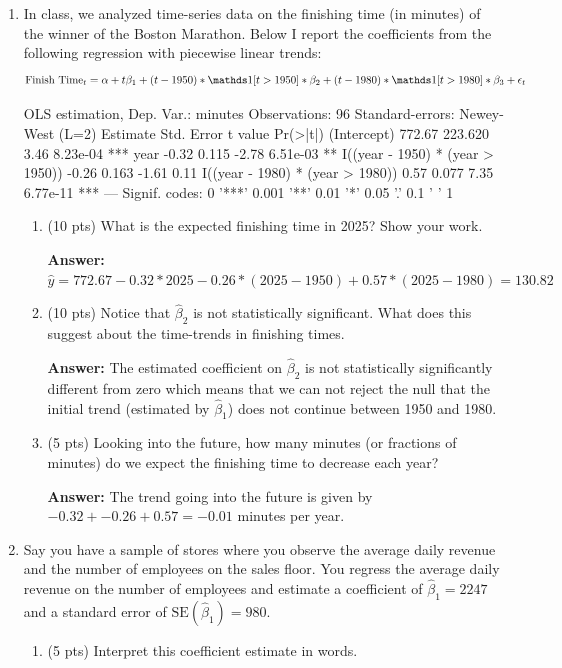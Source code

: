 \documentclass[12pt]{article}
\newcommand{\answer}[1]{{\color{blue_winged_teal}\textbf{Answer:} #1}}
\newcommand{\pts}[1]{{\color{zinc500}(#1 pts)}}
\begin{document}
\begin{enumerate}
  \newpage
  \item In class, we analyzed time-series data on the finishing time (in minutes) of the winner of the Boston Marathon. Below I report the coefficients from the following regression with piecewise linear trends:
  \vspace*{-\bigskipamount}
  $$
    \text{Finish Time}_t = \alpha + t \beta_1 + (t - 1950) * \one{t > 1950} * \beta_2 + (t - 1980) * \one{t > 1980} * \beta_3 + \epsilon_t
  $$

  \begin{codeblock}[{}]
OLS estimation, Dep. Var.: minutes
Observations: 96
Standard-errors: Newey-West (L=2)
                                  Estimate  Std. Error  t value   Pr(>|t|)
(Intercept)                         772.67     223.620     3.46   8.23e-04 ***
year                                 -0.32       0.115    -2.78   6.51e-03 **
I((year - 1950) * (year > 1950))     -0.26       0.163    -1.61   0.11
I((year - 1980) * (year > 1980))      0.57       0.077     7.35   6.77e-11 ***
---
Signif. codes:  0 '***' 0.001 '**' 0.01 '*' 0.05 '.' 0.1 ' ' 1
  \end{codeblock}

  \begin{enumerate}
    \item \pts{10} What is the expected finishing time in 2025? Show your work.

    \answer{
      $\hat{y} = 772.67 - 0.32 * 2025 - 0.26 * (2025 - 1950) + 0.57 * (2025 - 1980) = 130.82$
    }

    \item \pts{10} Notice that $\hat{\beta}_2$ is not statistically significant. What does this suggest about the time-trends in finishing times.

    \answer{
      The estimated coefficient on $\hat{\beta}_2$ is not statistically significantly different from zero which means that we can not reject the null that the initial trend (estimated by $\hat{\beta}_1$) does not continue between 1950 and 1980.
    }

    \item \pts{5} Looking into the future, how many minutes (or fractions of minutes) do we expect the finishing time to decrease each year?

    \answer{The trend going into the future is given by $-0.32 + -0.26 + 0.57 = -0.01$ minutes per year.}
  \end{enumerate}




  \vspace*{2\bigskipamount}
  \item Say you have a sample of stores where you observe the average daily revenue and the number of employees on the sales floor. You regress the average daily revenue on the number of employees and estimate a coefficient of $\hat{\beta}_1 = 2247$ and a standard error of $\text{SE}(\hat{\beta}_1) = 980$.
  \begin{enumerate}
    \item \pts{5} Interpret this coefficient estimate in words.


\end{enumerate}
\end{enumerate}
\end{document}
